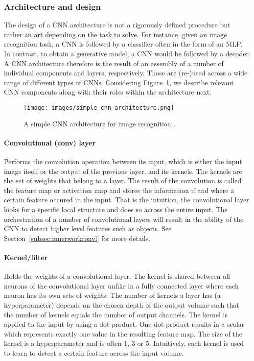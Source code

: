 \documentclass[12pt,a4paper]{article}
\begin{document}
\subsubsection{Architecture and design}
The design of a CNN architecture is not a rigorously defined procedure but rather an art depending on the task to solve. For instance, given an image recognition task, a CNN is followed by a classifier often in the form of an MLP. In contrast, to obtain a generative model, a CNN would be followed by a decoder. A CNN architecture therefore is the result of an assembly of a number of individual components and layers, respectively. Those are (re-)used across a wide range of different types of CNNs. Considering Figure~\ref{fig:simple_cnn_arch}, we describe relevant CNN components along with their roles within the architecture  next. 
\begin{figure}[H]
\centering
\texttt{[image: images/simple\_cnn\_architecture.png]}
\caption{A simple CNN architecture for image recognition \cite{cnn_arch_article}.}
\label{fig:simple_cnn_arch}
\end{figure}

\paragraph{Convolutional (conv) layer} Performs the convolution operation between its input, which is either the input image itself or the output of the previous layer, and its kernels. The kernels are the set of weights that belong to a layer. The result of the convolution is called the feature map or activation map and stores the information if and where a certain feature occured in the input. That is the intuition, the convolutional layer looks for a specific local structure and does so across the entire input. The orchestration of a number of convolutional layers will result in the ability of the CNN to detect higher level features such as objects. See Section~\ref{subsec:innerworkconvl} for more details. 

\paragraph{Kernel/filter            } Holds the weights of a convolutional layer. The kernel is shared between all neurons of the convolutional layer unlike in a fully connected layer where each neuron has its own sets of weights. The number of kernels a layer has (a hyperparameter) depends on the chosen depth of the output volume such that the number of kernels equals the number of output channels. The kernel is applied to the input by using a dot product. One dot product results in a scalar which represents exactly one value in the resulting feature map. The size of the kernel is a hyperparameter and is often 1, 3 or 5. Intuitively, each kernel is used to learn to detect a certain feature across the input volume.
\end{document}

